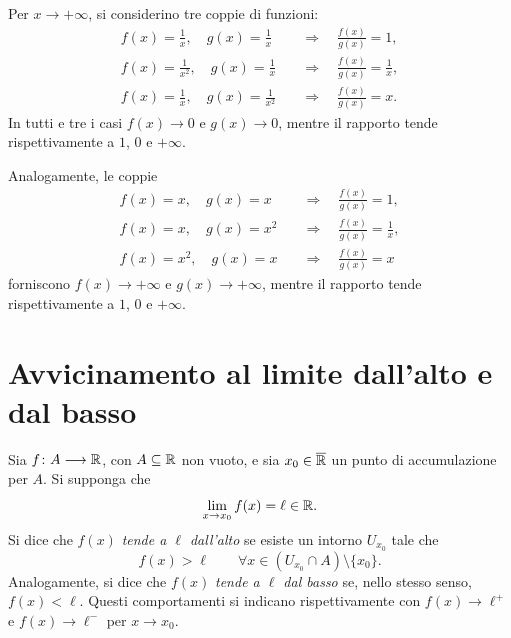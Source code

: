\begin{example}
\label{ex:lez14-rapporto-indeterminato}
Per \(x\to+\infty\), si considerino tre coppie di funzioni:
\[
\begin{aligned}
  f(x)=\frac1x,\quad g(x)=\frac1x
    &\quad\Longrightarrow\quad \frac{f(x)}{g(x)}=1,\\
  f(x)=\frac1{x^2},\quad g(x)=\frac1x
    &\quad\Longrightarrow\quad \frac{f(x)}{g(x)}=\frac1x,\\
  f(x)=\frac1x,\quad g(x)=\frac1{x^2}
    &\quad\Longrightarrow\quad \frac{f(x)}{g(x)}=x.
\end{aligned}
\]
In tutti e tre i casi \(f(x)\to0\) e \(g(x)\to0\),
mentre il rapporto tende rispettivamente a \(1\), \(0\)
e \(+\infty\).

Analogamente, le coppie
\[
\begin{aligned}
  f(x)=x,\quad g(x)=x
    &\quad\Longrightarrow\quad \frac{f(x)}{g(x)}=1,\\
  f(x)=x,\quad g(x)=x^2
    &\quad\Longrightarrow\quad \frac{f(x)}{g(x)}=\frac1x,\\
  f(x)=x^2,\quad g(x)=x
    &\quad\Longrightarrow\quad \frac{f(x)}{g(x)}=x
\end{aligned}
\]
forniscono \(f(x)\to+\infty\) e \(g(x)\to+\infty\),
mentre il rapporto tende rispettivamente a \(1\), \(0\)
e \(+\infty\).
\end{example}


\section{Avvicinamento al limite dall'alto e dal basso}
\label{sec:lez14-avvicinamento-valore}

\begin{definition}
\label{def:lez14-avvicinamento-valore}
Sia \(f\colon A\longrightarrow\mathbb{R}\), con
\(A\subseteq\mathbb{R}\) non vuoto, e sia
\(x_0\in\overline{\mathbb{R}}\) un punto di accumulazione per \(A\).
Si supponga che
\[
  \lim_{x\to x_0}f(x)=\ell\in\mathbb{R}.
\]
Si dice che \(f(x)\) \emph{tende a \(\ell\) dall'alto} se
esiste un intorno \(U_{x_0}\) tale che
\[
  f(x)>\ell
  \qquad\forall x\in(U_{x_0}\cap A)\setminus\{x_0\}.
\]
Analogamente, si dice che \(f(x)\) \emph{tende a
\(\ell\) dal basso} se, nello stesso senso,
\(f(x)<\ell\). Questi comportamenti si indicano
rispettivamente con \(f(x)\to\ell^+\) e
\(f(x)\to\ell^-\) per \(x\to x_0\).
\end{definition}

